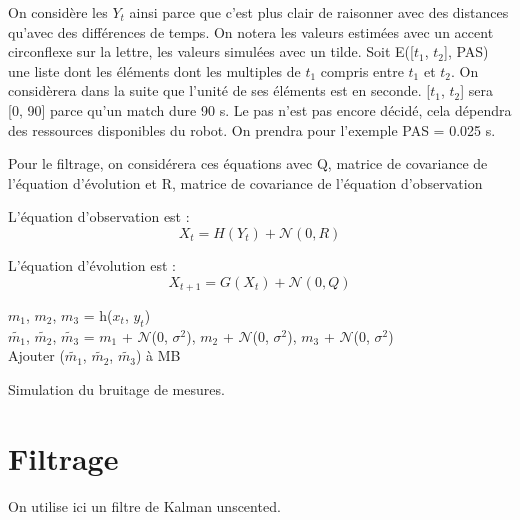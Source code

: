 \documentclass[a4paper, 8pt]{article}
\begin{document}
On considère les $Y_t$ ainsi parce que c'est plus clair de raisonner avec des distances qu'avec des différences de temps. On notera les valeurs estimées avec un accent circonflexe sur la lettre, les valeurs simulées avec un tilde.
Soit E([$t_1$, $t_2$], PAS) une liste dont les éléments dont les multiples de $t_1$ compris entre $t_1$ et $t_2$. On considèrera dans la suite que l'unité de ses éléments est en seconde. 
[$t_1$, $t_2$] sera [0, 90] parce qu'un match dure 90 s. Le pas n'est pas encore décidé, cela dépendra des ressources disponibles du robot. On prendra pour l'exemple PAS = 0.025 s.

Pour le filtrage, on considérera ces équations avec Q, matrice de covariance de l'équation d'évolution et R, matrice de covariance de l'équation d'observation

L'équation d'observation est : 
\begin{equation}
	X_t = H(Y_t) + \mathcal{N}(0, R)
\end{equation}

L'équation d'évolution est : 
\begin{equation}
	X_{t+1} = G(X_{t}) + \mathcal{N}(0, Q)
\end{equation}

\begin{algorithm}[H]
		
		{$m_1$, $m_2$, $m_3$ = h($x_t$, $y_t$) \\
		$\tilde{m_1}$, $\tilde{m_2}$, $\tilde{m_3}$ = {$m_1$} + $\mathcal{N}$(0, $\sigma^2$), {$m_2$} + $\mathcal{N}$(0, $\sigma^2$), {$m_3$} + $\mathcal{N}$(0, $\sigma^2$)\\
		Ajouter ($\tilde{m_1}$, $\tilde{m_2}$, $\tilde{m_3}$) à MB
		}
		
	\caption{Simulation du bruitage de mesures.}
	\end{algorithm}

\section{Filtrage}

On utilise ici un filtre de Kalman unscented.

%		
%	
\end{document}
